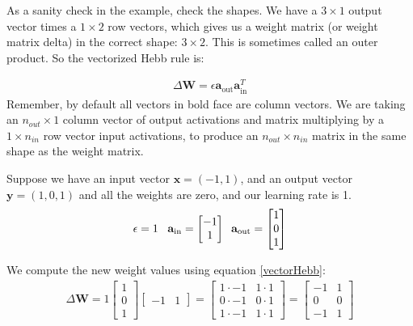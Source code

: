 As a sanity check in the example, check the shapes. We have a $3 \times 1$ output vector times a $1 \times 2$ row vectors, which gives us a weight matrix (or weight matrix delta) in the correct shape: $3 \times 2$. This is sometimes called an outer product. So the vectorized Hebb rule is:

\begin{eqnarray}
\label{vectorHebb}
\Delta \mathbf{W}  = \epsilon \mathbf{a}_{\text{out}} \mathbf{a}_{\text{in}} ^T
\end{eqnarray}
Remember, by default all vectors in bold face are column vectors. We are taking an $n_{out} \times 1$ column vector of output activations and matrix multiplying by a $1 \times n_{in}$ row vector input activations, to produce an $n_{out} \times n_{in}$ matrix in the same shape as the weight matrix.

Suppose we have an input vector $\mathbf{x} = (-1, 1)$, and an output vector $\mathbf{y} = (1,0,1)$ and all the weights are zero, and our learning rate is 1.
\begin{equation*}
\epsilon = 1 \; \; \; \; \\
\mathbf{a}_{\text{in}} = \begin{bmatrix} -1 \\ 1 \end{bmatrix} \\
\; \; \mathbf{a}_{\text{out}} = \begin{bmatrix} 1 \\ 0 \\ 1 \end{bmatrix}
\end{equation*}

We compute the new weight values using equation \eqref{vectorHebb}:
\begin{align*}
\Delta \mathbf{W}  = 1
\begin{bmatrix} 1 \\ 0 \\ 1 \end{bmatrix}
\begin{bmatrix} -1 & 1 \end{bmatrix}
= \begin{bmatrix} 1 \cdot -1 & 1 \cdot 1 \\ 0 \cdot -1 & 0 \cdot 1 \\ 1 \cdot -1 & 1 \cdot 1 \end{bmatrix}
= \begin{bmatrix} -1 & 1 \\ 0 & 0 \\  -1 & 1  \end{bmatrix}
\end{align*}

